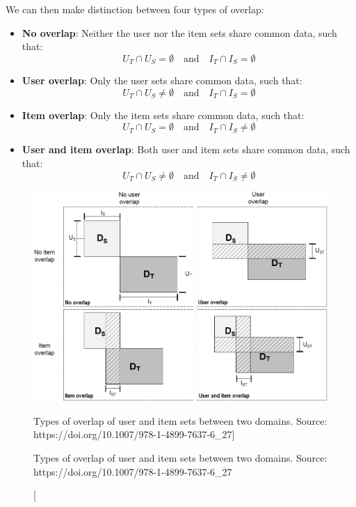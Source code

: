 We can then make distinction between four types of overlap:
\begin{itemize}
\item \textbf{No overlap}: Neither the user nor the item sets share common data, such that:
\begin{equation*}
U_T \cap U_S = \emptyset \quad \text{and} \quad I_T \cap I_S = \emptyset
\end{equation*}
\item \textbf{User overlap}: Only the user sets share common data, such that:
\begin{equation*}
U_T \cap U_S \neq \emptyset \quad \text{and} \quad I_T \cap I_S = \emptyset
\end{equation*}
\item \textbf{Item overlap}: Only the item sets share common data, such that:
\begin{equation*}
U_T \cap U_S = \emptyset \quad \text{and} \quad I_T \cap I_S \neq \emptyset
\end{equation*}
\item \textbf{User and item overlap}: Both user and item sets share common data, such that:
\begin{equation*}
U_T \cap U_S \neq \emptyset \quad \text{and} \quad I_T \cap I_S \neq \emptyset
\end{equation*}
\end{itemize}
\begin{figure}[hbt]
  \centering
  \includegraphics[width=\textwidth]{pictures/domains-overlap}
  \caption
  [Types of overlap of user and item sets between two domains. Source: https://doi.org/10.1007/978-1-4899-7637-6\_27]
  {\protect\raggedright Types of overlap of user and item sets between two domains. Source: https://doi.org/10.1007/978-1-4899-7637-6\_27}
\end{figure}


